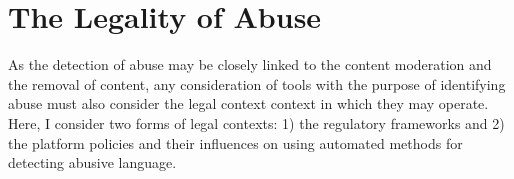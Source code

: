 %

\section{The Legality of Abuse}

As the detection of abuse may be closely linked to the content moderation and the removal of content, any consideration of tools with the purpose of identifying abuse must also consider the legal context context in which they may operate. Here, I consider two forms of legal contexts: 1) the regulatory frameworks and 2) the platform policies and their influences on using automated methods for detecting abusive language.


